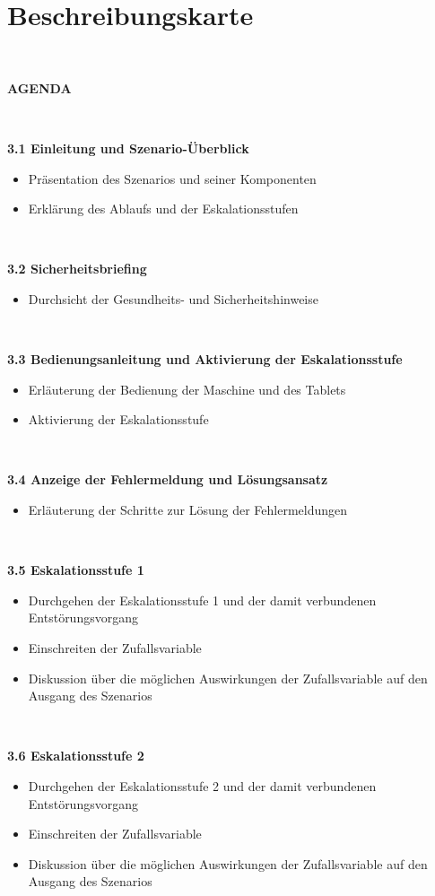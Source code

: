 \section{Beschreibungskarte}

\ 

\textbf{AGENDA}

\ 

\textbf{3.1 Einleitung und Szenario-Überblick} 
\begin{itemize}
\item
Präsentation des Szenarios und seiner Komponenten
\item
Erklärung des Ablaufs und der Eskalationsstufen
\end{itemize}

\

\textbf{3.2 Sicherheitsbriefing} 
\begin{itemize}
\item
Durchsicht der Gesundheits- und Sicherheitshinweise
\end{itemize}

\

\textbf{3.3 Bedienungsanleitung und Aktivierung der Eskalationsstufe}
\begin{itemize}
\item
Erläuterung der Bedienung der Maschine und des Tablets
\item
Aktivierung der Eskalationsstufe 
\end{itemize}

\

\textbf{3.4 Anzeige der Fehlermeldung und Lösungsansatz }
\begin{itemize}
\item
Erläuterung der Schritte zur Lösung der Fehlermeldungen
\end{itemize}

\

\textbf{3.5 Eskalationsstufe 1}
\begin{itemize}
\item
Durchgehen der Eskalationsstufe 1 und der damit verbundenen Entstörungsvorgang
\item 
Einschreiten der Zufallsvariable
\item
Diskussion über die möglichen Auswirkungen der Zufallsvariable auf den Ausgang des Szenarios
\end{itemize}

\

\textbf{3.6 Eskalationsstufe 2}
\begin{itemize}
\item
Durchgehen der Eskalationsstufe 2 und der damit verbundenen Entstörungsvorgang
\item
Einschreiten der Zufallsvariable
\item
Diskussion über die möglichen Auswirkungen der Zufallsvariable auf den Ausgang des Szenarios
\end{itemize}

